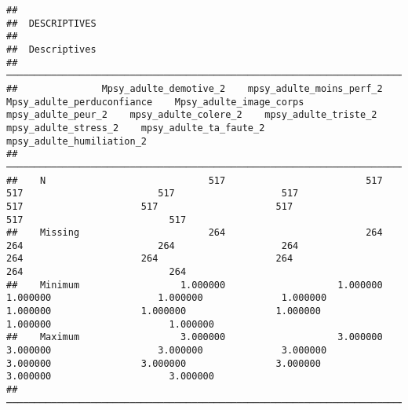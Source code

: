 \documentclass[
]{article}
\begin{document}
\begin{verbatim}
## 
##  DESCRIPTIVES
## 
##  Descriptives                                                                                                                                                                                                                                                                    
##  ─────────────────────────────────────────────────────────────────────────────────────────────────────────────────────────────────────────────────────────────────────────────────────────────────────────────────────────────────────────────────────────────────────────────── 
##               Mpsy_adulte_demotive_2    mpsy_adulte_moins_perf_2    Mpsy_adulte_perduconfiance    Mpsy_adulte_image_corps    mpsy_adulte_peur_2    mpsy_adulte_colere_2    mpsy_adulte_triste_2    mpsy_adulte_stress_2    mpsy_adulte_ta_faute_2    mpsy_adulte_humiliation_2   
##  ─────────────────────────────────────────────────────────────────────────────────────────────────────────────────────────────────────────────────────────────────────────────────────────────────────────────────────────────────────────────────────────────────────────────── 
##    N                             517                         517                           517                        517                   517                     517                     517                     517                       517                          517   
##    Missing                       264                         264                           264                        264                   264                     264                     264                     264                       264                          264   
##    Minimum                  1.000000                    1.000000                      1.000000                   1.000000              1.000000                1.000000                1.000000                1.000000                  1.000000                     1.000000   
##    Maximum                  3.000000                    3.000000                      3.000000                   3.000000              3.000000                3.000000                3.000000                3.000000                  3.000000                     3.000000   
##  ───────────────────────────────────────────────────────────────────────────────────────────────────────────────────────────────────────────────────────────────────────────────────────────────────────────────────────────────────────────────────────────────────────────────
\end{verbatim}
\end{document}
